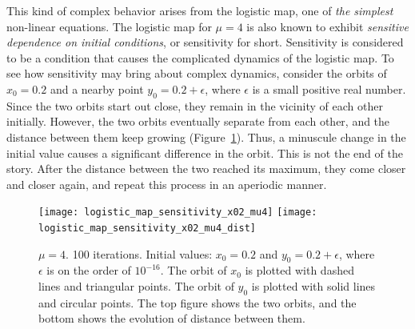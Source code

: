 \documentclass[10pt,twoside,draft]{book}
\begin{document}
This kind of complex behavior arises from the logistic map, one of \textit{the simplest} non-linear equations.
The logistic map for $\mu = 4$ is also known to exhibit \textit{sensitive dependence on initial conditions}, or sensitivity for short.
Sensitivity is considered to be a condition that causes the complicated dynamics of the logistic map.
To see how sensitivity may bring about complex dynamics, consider the orbits of $x_0 = 0.2$ and a nearby point $y_0 = 0.2 + \epsilon$, where $\epsilon$ is a small positive real number.
Since the two orbits start out close, they remain in the vicinity of each other initially.
However, the two orbits eventually separate from each other, and the distance between them keep growing (Figure~\ref{fig:logistic_sensitivity}).
Thus, a minuscule change in the initial value causes a significant difference in the orbit.
This is not the end of the story.
After the distance between the two reached its maximum, they come closer and closer again, and repeat this process in an aperiodic manner.
\begin{figure}[p]
  \centering
  \texttt{[image: logistic\_map\_sensitivity\_x02\_mu4]}
  \texttt{[image: logistic\_map\_sensitivity\_x02\_mu4\_dist]}
  \caption{
    $\mu = 4$. 100 iterations.
    Initial values: $x_0 = 0.2$ and $y_0 = 0.2 + \epsilon$, where $\epsilon$ is on the order of $10^{-16}$.
    The orbit of $x_0$ is plotted with dashed lines and triangular points.
    The orbit of $y_0$ is plotted with solid lines and circular points.
    The top figure shows the two orbits, and the bottom shows the evolution of distance between them.
  }
  \label{fig:logistic_sensitivity}
\end{figure}

\end{document}
